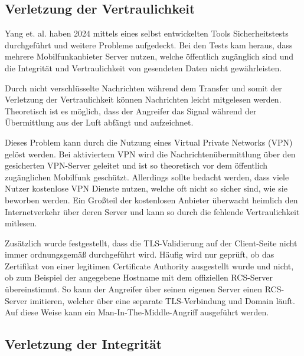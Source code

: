 \documentclass[conference]{IEEEtran}
\begin{document}
\subsection{Verletzung der Vertraulichkeit}

Yang et. al. \cite{uncoversec} haben 2024 mittels eines selbst entwickelten Tools Sicherheitstests durchgeführt und weitere Probleme aufgedeckt.
Bei den Tests kam heraus, dass mehrere Mobilfunkanbieter Server nutzen, welche öffentlich zugänglich sind und die Integrität und Vertraulichkeit von gesendeten Daten nicht gewährleisten.

Durch nicht verschlüsselte Nachrichten während dem Transfer und somit der Verletzung der Vertraulichkeit können Nachrichten leicht mitgelesen werden.
Theoretisch ist es möglich, dass der Angreifer das Signal während der Übermittlung aus der Luft abfängt und aufzeichnet.

Dieses Problem kann durch die Nutzung eines Virtual Private Networks (VPN) gelöst werden.
Bei aktiviertem VPN wird die Nachrichtenübermittlung über den gesicherten VPN-Server geleitet und ist so theoretisch vor dem öffentlich zugänglichen Mobilfunk geschützt.
Allerdings sollte bedacht werden, dass viele Nutzer kostenlose VPN Dienste nutzen, welche oft nicht so sicher sind, wie sie beworben werden.
Ein Großteil der kostenlosen Anbieter überwacht heimlich den Internetverkehr über deren Server und kann so durch die fehlende Vertraulichkeit mitlesen.

Zusätzlich wurde festgestellt, dass die TLS-Validierung auf der Client-Seite nicht immer ordnungsgemäß durchgeführt wird.
Häufig wird nur geprüft, ob das Zertifikat von einer legitimen Certificate Authority ausgestellt wurde und nicht, ob zum Beispiel der angegebene Hostname mit dem offiziellen RCS-Server übereinstimmt.
So kann der Angreifer über seinen eigenen Server einen RCS-Server imitieren, welcher über eine separate TLS-Verbindung und Domain läuft.
Auf diese Weise kann ein Man-In-The-Middle-Angriff ausgeführt werden.

\subsection{Verletzung der Integrität}
\end{document}
